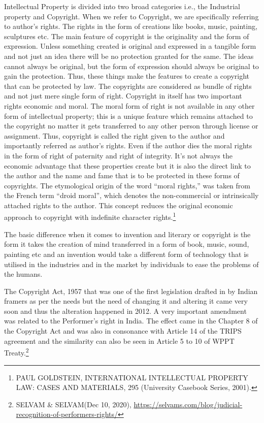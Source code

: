 \begin{multicols}{2}
\noi
Intellectual Property is divided into two broad categories i.e., the Industrial property and
Copyright. When we refer to Copyright, we are specifically referring to author’s rights. The
rights in the form of creations like books, music, painting, sculptures etc. The main feature of
copyright is the originality and the form of expression. Unless something created is original
and expressed in a tangible form and not just an idea there will be no protection granted for
the same. The ideas cannot always be original, but the form of expression should always be
original to gain the protection. Thus, these things make the features to create a copyright that
can be protected by law. The copyrights are considered as bundle of rights and not just mere
single form of right. Copyright in itself has two important rights economic and moral. The
moral form of right is not available in any other form of intellectual property; this is a unique
feature which remains attached to the copyright no matter it gets transferred to any other person through license or assignment. Thus, copyright is called the right given to the author
and importantly referred as author’s rights. Even if the author dies the moral rights in the
form of right of paternity and right of integrity. It’s not always the economic advantage that
these properties create but it is also the direct link to the author and the name and fame that is
to be protected in these forms of copyrights. The etymological origin of the word “moral
rights,” was taken from the French term “droid moral”, which denotes the non-commercial or
intrinsically attached rights to the author. This concept reduces the original economic
approach to copyright with indefinite character rights.\footnote{PAUL GOLDSTEIN, INTERNATIONAL INTELLECTUAL PROPERTY LAW: CASES AND
MATERIALS, 295 (University Casebook Series, 2001).}

\noi
The basic difference when it comes to invention and literary or copyright is the form it takes
the creation of mind transferred in a form of book, music, sound, painting etc and an
invention would take a different form of technology that is utilised in the industries and in the
market by individuals to ease the problems of the humans. 


\noi
The Copyright Act, 1957 that was one of the first legislation drafted in by Indian framers as
per the needs but the need of changing it and altering it came very soon and thus the
alteration happened in 2012. A very important amendment was related to the Performer’s
right in India. The effect came in the Chapter 8 of the Copyright Act and was also in
consonance with Article 14 of the TRIPS agreement and the similarity can also be seen in
Article 5 to 10 of WPPT Treaty.\footnote{SELVAM \& SELVAM(Dec 10, 2020), \url{https://selvams.com/blog/judicial-recognition-of-performers-rights/}}


\end{multicols}
